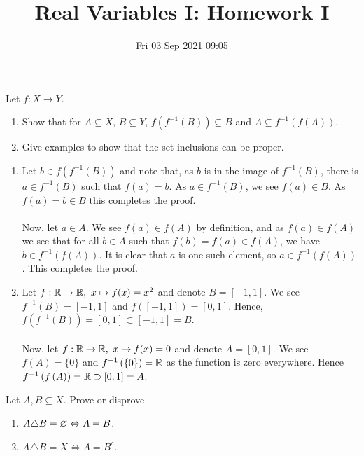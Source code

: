 \documentclass[a4paper]{article}
\title{Real Variables I: Homework I}
\date{Fri 03 Sep 2021 09:05}
\begin{document}
\maketitle
\begin{problem}[1]
	Let \(f:X \to Y\).
	\begin{enumerate}
		\item Show that for \(A\subseteq X\), \(B\subseteq Y\), \(f\left( f^{-1}\left( B \right)  \right) \subseteq B\) and \(A \subseteq f^{-1}\left( f\left( A \right)  \right) \).
			\item Give examples to show that the set inclusions can be proper.
	\end{enumerate}
\end{problem}
\begin{solution}
	\begin{enumerate}
	\item Let \(b \in f\left( f^{-1} \left( B \right)  \right) \) and note that, as \(b\) is in the image of \(f^{-1}\left( B \right) \), there is \(a \in f^{-1}\left( B \right) \) such that \(f\left( a \right) = b\). As \(a \in f^{-1} \left( B \right) \), we see \(f\left( a \right) \in B\). As \(f\left( a \right) = b \in B\) this completes the proof.\\
\\ Now, let \(a \in A\). We see \(f\left( a \right) \in f\left( A \right) \) by definition, and as \(f\left( a \right) \in f\left( A \right) \) we see that for all \(b \in A\) such that \(f\left( b \right) = f\left( a \right) \in f\left( A \right) \), we have \(b \in f^{-1} \left( f\left( A \right)  \right) \). It is clear that \(a\) is one such element, so \(a \in f^{-1} \left( f\left( A \right)  \right) \). This completes the proof.
	\item Let \(f: \mathbb{R} \to \mathbb{R}, \ x \mapsto f(x) = x^2\) and denote \(B = [-1,1]\). We see \(f^{-1} \left( B \right) = [-1,1]\) and \(f\left( [-1, 1] \right) = [0, 1]\). Hence, \(f\left( f^{-1} \left( B \right) \right) = [0, 1] \subset [-1, 1] = B\).
	\\\\
	Now, let \(f: \mathbb{R} \to \mathbb{R}, \ x \mapsto f(x) = 0\) and denote \(A = [0, 1]\). We see \(f\left( A \right) = \{0\} \) and \(f^{-1}\left( \{0\}  \right) = \mathbb{R} \) as the function is zero everywhere. Hence \(f^{-1} \left( f\left( A \right)  \right) = \mathbb{R} \supset [0, 1] = A\).
	\end{enumerate}
\end{solution}
\newpage
\begin{problem}[2]
	Let \(A, B \subseteq X\). Prove or disprove
	\begin{enumerate}
		\item \(A \triangle B = \varnothing \Leftrightarrow A = B\).
			\item \(A \triangle B = X \iff A = B^{c}\).
	\end{enumerate}
\end{problem}
\end{document}
